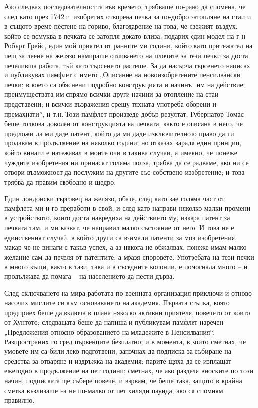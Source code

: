\documentclass[12pt]{book}
\begin{document}
Ако следвах последователността във времето, трябваше по-рано да спомена, че след като през 1742 г. изобретих отворена печка за по-добро затопляне на стаи и в същото време пестене на гориво, благодарение на това, че свежият въздух, който се всмуква в печката се затопля докато влиза, подарих един модел на г-н Робърт Грейс, един мой приятел от ранните ми години, който като притежател на пещ за леене на желязо намираше отливането на плочите за тези печки за доста печеливша работа, тъй като търсенето растеше. За да насърча търсенето написах и публикувах памфлет с името „Описание на новоизобретените пенсилвански печки; в което са обяснени подробно конструкцията и начинът им на действие; преимуществата им спрямо всички други начини за отопление на стаи представени; и всички възражения срещу тяхната употреба оборени и премахнати”, и т.н. Този памфлет произведе добър резултат. Губернатор Томас беше толкова доволен от конструкцията на печката, както е описана в него, че предложи да ми даде патент, който да ми даде изключителното право да ги продавам в продължение на няколко години; но отказах заради един принцип, който винаги е натежавал в моите очи в такива случаи, а именно, че понеже чуждите изобретения ни принасят голяма полза, трябва да се радваме, ако ни се отвори възможност да послужим на другите със собствено изобретение; и това трябва да правим свободно и щедро.

Един лондонски търговец на желязо, обаче, след като зае голяма част от памфлета ми и го преработи в свой, и след като направи няколко малки промени в устройството, които доста навредиха на действието му, изкара патент за печката там, и ми казват, че направил малко състояние от него. И това не е единственият случай, в който други са взимали патенти за мои изобретения, макар че не винаги с такъв успех, а аз никога не обжалвах, понеже имам малко желание сам да печеля от патентите, а мразя споровете. Употребата на тези печки в много къщи, както в тази, така и в съседните колонии, е помогнала много – и продължава да помага – на населението да пести дърва.

След сключването на мира работата по военната организация приключи и отново насочих мислите си към основаването на академия. Първата стъпка, която предприех беше да включа в плана няколко активни приятеля, повечето от които от Хунтото; следващата беше да напиша и публикувам памфлет наречен „Предложения относно образованието на младежите в Пенсилвания“. Разпространих го сред първенците безплатно; и в момента, в който сметнах, че умовете им са били леко подготвени, започнах да подписка за събиране на средства за отваряне и издръжка на академия; парите щяха да се изплащат ежегодно в продължение на пет години; сметнах, че ако разделя вноските по този начин, подписката ще събере повече, и вярвам, че беше така, защото в крайна сметка възлизаше на не по-малко от пет хиляди паунда, ако си спомням правилно. 
\end{document}
